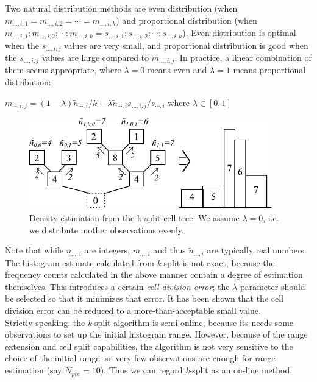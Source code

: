 
Two natural distribution methods are even
distribution (when
$m_{...,i,1} = m_{...,i,2} = \cdots = m_{...,i,k}$) and proportional
distribution (when
$m_{...,i,1} : m_{...,i,2} : \cdots : m_{...,i,k} = s_{...,i,1} : s_{...,i,2} : \cdots : s_{...,i,k}$).
Even distribution is optimal when the
$s_{...,i,j}$ values are very small, and proportional distribution is
good when the $s_{...,i,j}$ values are large compared to
$m_{...,i,j}$. In practice, a linear combination of them seems
appropriate, where $\lambda=0$ means even and $\lambda=1$ means
proportional distribution:


$m_{\cdots,i,j} = (1-\lambda)\tilde{n}_{\cdots,i}/k + \lambda \tilde{n}_{\cdots,i} s_{...,i,j} / s_{\cdots,i}$
where $\lambda\in[0,1]$

\begin{figure}[htbp]
  \begin{center}
    \includegraphics[width=4.147in, height=1.567in]{figures/usmanFig16}
    \caption{Density estimation from the k-split cell tree. We
      assume $\lambda=0$, i.e. we distribute mother observations
      evenly.}
  \end{center}
\end{figure}


Note that while $n_{...,i}$ are integers, $m_{...,i}$ and thus
$\tilde{n}_{...,i}$ are typically real numbers. The histogram estimate
calculated from \textit{k}-split is not exact, because the frequency
counts calculated in the above manner contain a degree of estimation
themselves. This introduces a certain \textit{cell division error};
the $\lambda$ parameter should be selected so that it minimizes that
error. It has been shown that the cell division error can
be reduced to a more-than-acceptable small value.\\
Strictly speaking, the \textit{k}-split algorithm is semi-online,
because its needs some observations to set up the initial histogram
range.  However, because of the range extension and cell split
capabilities, the algorithm is not very sensitive to the choice of the
initial range, so very few observations are enough for range
estimation (say $N_{pre}=10$). Thus we can regard \textit{k}-split as
an on-line method.

